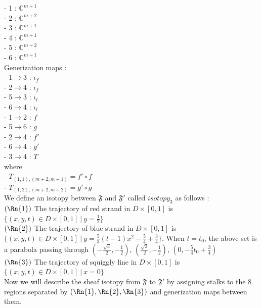 - 1 : $\mathbb{C}^{m+1}$\\
- 2 : $\mathbb{C}^{m+2}$\\
- 3 : $\mathbb{C}^{m+1}$\\
- 4 : $\mathbb{C}^{m+1}$\\
- 5 : $\mathbb{C}^{m+2}$\\
- 6 : $\mathbb{C}^{m+1}$\\

Generization maps : \\
- 1$\rightarrow$3 : $\iota_f$\\
- 2$\rightarrow$4 : $\iota_f$\\
- 5$\rightarrow$3 : $\iota_l$\\
- 6$\rightarrow$4 : $\iota_l$\\
- 1$\rightarrow$2 : $f$\\
- 5$\rightarrow$6 : $g$\\
- 2$\rightarrow$4 : $f'$\\
- 6$\rightarrow$4 : $g'$\\
- 3$\rightarrow$4 : $T$\\

where \\
- $T_{(1,1),(m+2,m+1)} = f'\circ f$\\
- $T_{(1,2),(m+2,m+2)}=g'\circ g$\\

We define an isotopy between $\mathfrak{F}$ and $\mathfrak{F}'$ called $isotopy_3$ as follows :\\

$(\Rn{1})$ The trajectory of red strand in $D\times [0,1]$ is $\{(x,y,t)\in D\times [0,1]~|~ y =\frac{1}{2}\}$\\

$(\Rn{2})$ The trajectory of blue strand in $D\times [0,1]$ is $\{(x,y,t)\in D\times [0,1]~|~ y =\frac{5}{3}(t-1)x^2 - \frac{5}{4}+\frac{3}{4}\}$. When $t=t_0$, the above set is a parabola passing through $(-\frac{\sqrt{3}}{2}, -\frac{1}{2})$, $(\frac{\sqrt{3}}{2}, -\frac{1}{2})$, $(0, -\frac{5}{4}t_0 + \frac{3}{4})$\\

$(\Rn{3})$ The trajectory of squiggly line in $D\times [0,1]$ is $\{(x,y,t)\in D\times [0,1]~|~ x =0\}$\\

Now we will describe the sheaf isotopy from $\mathfrak{F}$ to $\mathfrak{F}'$ by assigning stalks to the 8 regions separated by $(\Rn{1},\Rn{2},\Rn{3})$ and generization maps between them.\\

